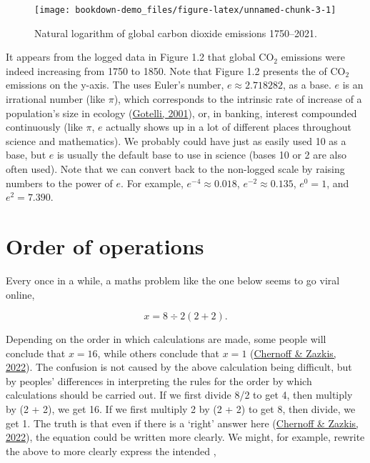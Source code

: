 \documentclass[
  openany]{krantz}
\begin{document}
\begin{figure}
\texttt{[image: bookdown-demo\_files/figure-latex/unnamed-chunk-3-1]} \caption{Natural logarithm of global carbon dioxide emissions 1750--2021.}\label{fig:unnamed-chunk-3}
\end{figure}

It appears from the logged data in Figure 1.2 that global CO\(_{2}\) emissions were indeed increasing from 1750 to 1850.
Note that Figure 1.2 presents the \emph{} of CO\(_{2}\) emissions on the y-axis.
The  uses Euler's number, \(e \approx 2.718282\), as a base.
 \(e\) is an irrational number (like \(\pi\)), which corresponds to the intrinsic rate of increase of a population's size in ecology (\protect\hyperlink{ref-Gotelli2001}{Gotelli, 2001}), or, in banking, interest compounded continuously (like \(\pi\), \(e\) actually shows up in a lot of different places throughout science and mathematics).
We probably could have just as easily used 10 as a base, but \(e\) is usually the default base to use in science (bases 10 or 2 are also often used).
Note that we can convert back to the non-logged scale by raising numbers to the power of \(e\).
For example, \(e^{-4} \approx 0.018\), \(e^{-2} \approx 0.135\), \(e^{0} = 1\), and \(e^{2} = 7.390\).

\hypertarget{order-of-operations}{%
\section{Order of operations}\label{order-of-operations}}

Every once in a while, a maths problem like the one below seems to go viral online,

\[x = 8 \div 2\left(2+2\right).\]

Depending on the order in which calculations are made, some people will conclude that \(x = 16\), while others conclude that \(x = 1\) (\protect\hyperlink{ref-Chernoff2022}{Chernoff \& Zazkis, 2022}).
The confusion is not caused by the above calculation being difficult, but by peoples' differences in interpreting the rules for the order by which calculations should be carried out.
If we first divide 8/2 to get 4, then multiply by (2 + 2), we get 16.
If we first multiply 2 by (2 + 2) to get 8, then divide, we get 1.
The truth is that even if there is a `right' answer here (\protect\hyperlink{ref-Chernoff2022}{Chernoff \& Zazkis, 2022}), the equation could be written more clearly.
We might, for example, rewrite the above to more clearly express the intended ,
\end{document}
